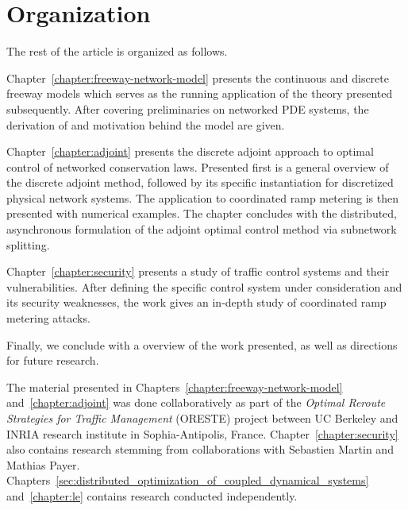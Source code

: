 \section{Organization}
\label{sec:organization}

The rest of the article is organized as follows.

Chapter~\ref{chapter:freeway-network-model} presents the continuous and discrete freeway models which serves as the running application of the theory presented subsequently.  After covering preliminaries on networked PDE systems, the derivation of and motivation behind the model are given.

Chapter~\ref{chapter:adjoint} presents the discrete adjoint approach to optimal control of networked conservation laws. Presented first is a general overview of the discrete adjoint method, followed by its specific instantiation for discretized physical network systems. The application to coordinated ramp metering is then presented with numerical examples. The chapter concludes with the distributed, asynchronous formulation of the adjoint optimal control method via subnetwork splitting.

Chapter~\ref{chapter:security} presents a study of traffic control systems and their vulnerabilities. After defining the specific control system under consideration and its security weaknesses, the work gives an in-depth study of coordinated ramp metering attacks.

Finally, we conclude with a overview of the work presented, as well as directions for future research.

The material presented in Chapters~\ref{chapter:freeway-network-model} and~\ref{chapter:adjoint} was done collaboratively as part of the \emph{Optimal Reroute Strategies for Traffic Management} (ORESTE) project between UC Berkeley and INRIA research institute in Sophia-Antipolis, France. Chapter~\ref{chapter:security} also contains research stemming from collaborations with Sebastien Martin and Mathias Payer. Chapters~\ref{sec:distributed_optimization_of_coupled_dynamical_systems} and~\ref{chapter:le} contains research conducted independently.